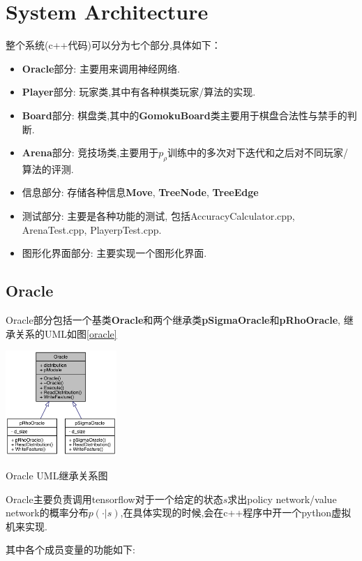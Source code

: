 \documentclass[twocolumn]{article}
\begin{document}
\section{System Architecture}

整个系统(c++代码)可以分为七个部分,具体如下：

\begin{itemize}
	\item \textbf{Oracle}部分: 主要用来调用神经网络.
	\item \textbf{Player}部分: 玩家类,其中有各种棋类玩家/算法的实现.
	\item \textbf{Board}部分: 棋盘类,其中的\textbf{GomokuBoard}类主要用于棋盘合法性与禁手的判断.
	\item \textbf{Arena}部分: 竞技场类,主要用于$p_\rho$训练中的多次对下迭代和之后对不同玩家/算法的评测.
	\item 信息部分: 存储各种信息\textbf{Move}, \textbf{TreeNode}, \textbf{TreeEdge}
	\item 测试部分: 主要是各种功能的测试, 包括AccuracyCalculator.cpp, ArenaTest.cpp, PlayerpTest.cpp.
	\item 图形化界面部分: 主要实现一个图形化界面.
\end{itemize}

\subsection{Oracle}

Oracle部分包括一个基类\textbf{Oracle}和两个继承类\textbf{pSigmaOracle}和\textbf{pRhoOracle}, 继承关系的UML如图\ref{oracle}

\begin{center}
\makeatletter
\def\@captype{figure}
\makeatother
\includegraphics [height=4cm]{oracle}
\caption{Oracle UML继承关系图}
\label{oracle}
\end{center}

Oracle主要负责调用tensorflow对于一个给定的状态$s$求出policy network/value network的概率分布$p(\cdot|s)$,在具体实现的时候,会在c++程序中开一个python虚拟机来实现.

其中各个成员变量的功能如下:
\end{document}
